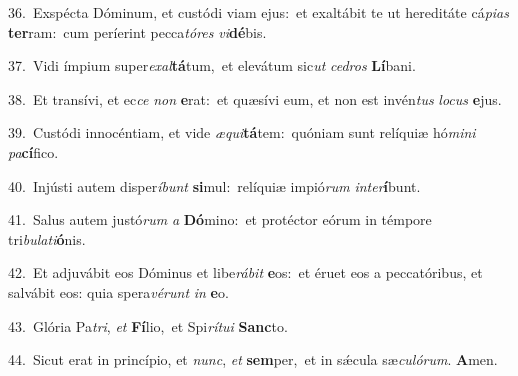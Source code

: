 {\numbfont\textcolor{\numbcolor}{36.}}~Exspécta Dóminum, et custódi viam ejus:~\dagger et exaltábit te ut hereditáte cá\-\textit{pi}\-\textit{as} \textbf{ter}\-ram:~\star cum períerint pecca\-\textit{tó}\-\textit{res} \textit{vi}\-\textbf{dé}bis.\par
{\numbfont\textcolor{\numbcolor}{37.}}~Vidi ímpium super\-\textit{ex}\-\textit{al}\textbf{tá}tum,~\star et elevátum sic\textit{ut} \textit{ce}\-\textit{dros} \textbf{Lí}\-bani.\par
{\numbfont\textcolor{\numbcolor}{38.}}~Et transívi, et ec\textit{ce} \textit{non} \textbf{e}\-rat:~\star et quæsívi eum, et non est invén\textit{tus} \textit{lo}\-\textit{cus} \textbf{e}\-jus.\par
{\numbfont\textcolor{\numbcolor}{39.}}~Custódi innocéntiam, et vide \textit{æ}\-\textit{qui}\textbf{tá}tem:~\star quóniam sunt relíquiæ hó\-\textit{mi}\-\textit{ni} \textit{pa}\-\textbf{cí}fico.\par
{\numbfont\textcolor{\numbcolor}{40.}}~Injústi autem disper\-\textit{í}\-\textit{bunt} \textbf{si}\-mul:~\star relíquiæ impió\textit{rum} \textit{in}\-\textit{ter}\textbf{í}bunt.\par
{\numbfont\textcolor{\numbcolor}{41.}}~Salus autem justó\textit{rum} \textit{a} \textbf{Dó}\-mino:~\star et protéctor eórum in témpore tri\-\textit{bu}\-\textit{la}\textit{ti}\textbf{ó}nis.\par
{\numbfont\textcolor{\numbcolor}{42.}}~Et adjuvábit eos Dóminus et libe\-\textit{rá}\-\textit{bit} \textbf{e}\-os:~\star et éruet eos a peccatóribus, et salvábit eos: quia spera\-\textit{vé}\-\textit{runt} \textit{in} \textbf{e}\-o.\par
{\numbfont\textcolor{\numbcolor}{43.}}~Glória Pa\-\textit{tri}\-, \textit{et} \textbf{Fí}\-lio,~\star et Spi\-\textit{rí}\-\textit{tu}\textit{i} \textbf{Sanc}\-to.\par
{\numbfont\textcolor{\numbcolor}{44.}}~Sicut erat in princípio, et \textit{nunc}\-, \textit{et} \textbf{sem}\-per,~\star et in sǽcula sæ\-\textit{cu}\-\textit{ló}\textit{rum}. \textbf{A}\-men.\par
